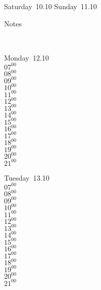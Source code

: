 \documentclass[11pt,a4paper]{book}\usepackage[]{graphicx}\usepackage[]{color}
\begin{document}
{{{{{{{{{{{{{{{\begin{tcolorbox}
\end{tcolorbox} 
\begin{tcolorbox}[height=(\textheight-10mm)/6]
Saturday~10.10
\tcblower
Sunday~11.10
\end{tcolorbox} %
\begin{tcolorbox}[height=(\textheight-10mm)/6,sidebyside=false]
Notes
\end{tcolorbox}
\clearpage
\vspace{2 mm}\\
\begin{tcolorbox}
Monday~12.10\\
{ 
  $07^{00}$\\
$08^{00}$\\
$09^{00}$\\
$10^{00}$\\
$11^{00}$\\
$12^{00}$\\
$13^{00}$\\
$14^{00}$\\
$15^{00}$\\
$16^{00}$\\
$17^{00}$\\
$18^{00}$\\
$19^{00}$\\
$20^{00}$\\
$21^{00}$}\\

\end{tcolorbox}
\begin{tcolorbox}
Tuesday~13.10\\
{ 
  $07^{00}$\\
$08^{00}$\\
$09^{00}$\\
$10^{00}$\\
$11^{00}$\\
$12^{00}$\\
$13^{00}$\\
$14^{00}$\\
$15^{00}$\\
$16^{00}$\\
$17^{00}$\\
$18^{00}$\\
$19^{00}$\\
$20^{00}$\\
$21^{00}$}\\


\end{tcolorbox}}}}}}}}}}}}}}}}
\end{document}
